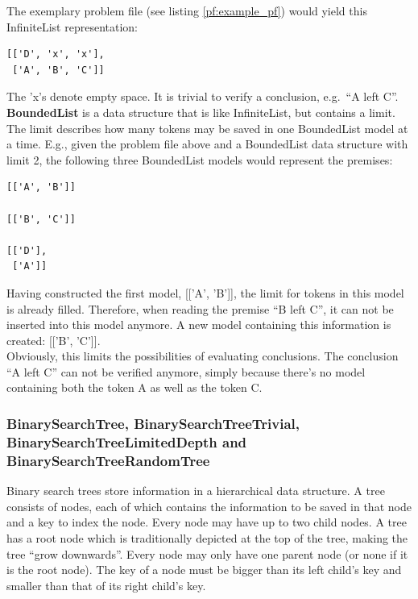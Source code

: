 \documentclass[hidelinks]{scrartcl}
\begin{document}
\noindent The exemplary problem file (see listing \ref{pf:example_pf}) would yield this InfiniteList representation:

\begin{lstlisting}[caption=InfiniteList representation, label=inflist_example_pf, frame=single]
[['D', 'x', 'x'],
 ['A', 'B', 'C']]
\end{lstlisting}

The 'x's denote empty space. It is trivial to verify a conclusion, e.g.\ ``A left C''. \\

\textbf{BoundedList} is a data structure that is like InfiniteList, but contains a limit. The limit describes how many \gls{token}s may be saved in one BoundedList model at a time. E.g., given the problem file above and a BoundedList data structure with limit 2, the following three BoundedList models would represent the \gls{premise}s:

\begin{lstlisting}[caption=BoundedList representation with limit 2, label=boundedlist_example_pf, frame=single]
[['A', 'B']]

[['B', 'C']]

[['D'],
 ['A']]
\end{lstlisting}

Having constructed the first model, [['A', 'B']], the limit for \gls{token}s in this model is already filled. Therefore, when reading the \gls{premise} ``B left C'', it can not be inserted into this model anymore. A new model containing this information is created: [['B', 'C']].\\
Obviously, this limits the possibilities of evaluating conclusions. The conclusion ``A left C'' can not be verified anymore, simply because there's no model containing both the \gls{token} A as well as the \gls{token} C.

\subsubsection{BinarySearchTree, BinarySearchTreeTrivial, BinarySearchTreeLimitedDepth and BinarySearchTreeRandomTree}
Binary search trees store information in a hierarchical data structure. A tree consists of nodes, each of which contains the information to be saved in that node and a key to index the node. Every node may have up to two child nodes. A tree has a root node which is traditionally depicted at the top of the tree, making the tree ``grow downwards''. Every node may only have one parent node (or none if it is the root node). The key of a node must be bigger than its left child's key and smaller than that of its right child's key. \\
\end{document}
